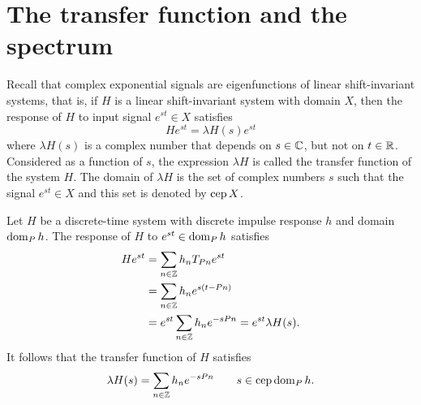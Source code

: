 

\section{The transfer function and the spectrum}

Recall that complex exponential signals are eigenfunctions of linear shift-invariant systems, that is, if $H$ is a linear shift-invariant system with domain $X$, then the response of $H$ to input signal $e^{st} \in X$ satisfies
 \[
He^{st} = \lambda H(s) e^{st}
\]
where $\lambda H(s)$ is a complex number that depends on $s \in {\mathbb C}$, but not on $t \in {\mathbb R}$.  Considered as a function of $s$, the expression $\lambda H$ is called the transfer function of the system $H$.  The domain of $\lambda H$ is the set of complex numbers $s$ such that the signal $e^{st} \in X$ and this set is denoted by $\operatorname{cep} X$.

Let $H$ be a discrete-time system with discrete impulse response $h$ and domain $\operatorname{dom}_P h$.  The response of $H$ to $e^{st} \in \operatorname{dom}_P h$ satisfies
\begin{align*}
H e^{st} &= \sum_{n \in {\mathbb Z}} h_n T_{Pn} e^{st} \\
&= \sum_{n \in {\mathbb Z}} h_n e^{s(t-Pn)} \\
&= e^{st} \sum_{n \in {\mathbb Z}} h_n e^{-sPn} = e^{st} \lambda H(s).
\end{align*}
It follows that the transfer function of $H$ satisfies
\[
\lambda H(s) = \sum_{n \in {\mathbb Z}} h_n e^{-sPn} \qquad s \in \operatorname{cep} \operatorname{dom}_P h.
\]

